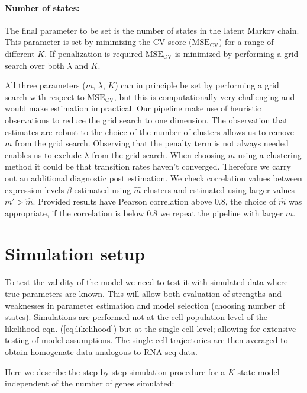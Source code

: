 \paragraph{Number of states:}
\label{sec:number-states}

The final parameter to be set is the number of states in the latent Markov chain. This parameter is set by minimizing the CV score ($\mathrm{MSE_{CV}}$) for a range of different $K$. If penalization is required $\mathrm{MSE_{CV}}$ is minimized by performing a grid search over both $\lambda$ and $K$.

All three parameters ($m$, $\lambda$, $K$) can in principle be set by performing a grid search with respect to $\mathrm{MSE_{CV}}$, but this is computationally very challenging and would make estimation impractical. Our pipeline make use of heuristic observations to reduce the grid search to one dimension. The observation that estimates are robust to the choice of the number of clusters allows us to remove $m$ from the grid search. Observing that the penalty term is not always needed enables us to exclude $\lambda$ from the grid search. When choosing $m$ using a clustering method it could be that transition rates haven't converged. Therefore we carry out an additional diagnostic post estimation. We check correlation values between expression levels $\beta$ estimated using $\hat{m}$ clusters and estimated using larger values $m' > \hat{m}$. Provided results have Pearson correlation above $0.8$, the choice of $\hat{m}$ was appropriate, if the correlation is below $0.8$ we repeat the pipeline with larger $m$.

\section{Simulation setup}
\label{sec:sim-study}

To test the validity of the model we need to test it with simulated data where true parameters are known. This will allow both evaluation of strengths and weaknesses in parameter estimation and model selection (choosing number of states). Simulations are performed not at the cell population level of the likelihood eqn. (\ref{eq:likelihood}) but at the single-cell level; allowing for extensive testing of model assumptions. The single cell trajectories are then averaged to obtain homogenate data analogous to RNA-seq data.

Here we describe the step by step simulation procedure for a $K$ state model independent of the number of genes simulated:

